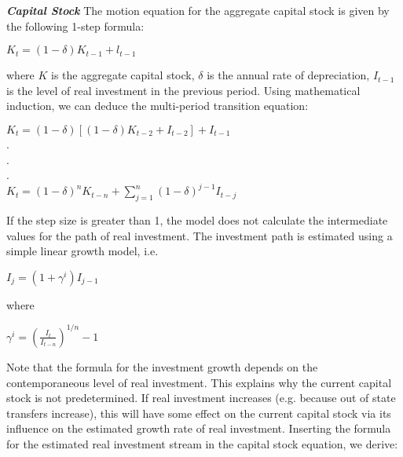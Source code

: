 \documentclass{article}
\begin{document}
\textbf{\textit{Capital Stock}}
The motion equation for the aggregate capital stock is given by the following 1-step formula:

\begin{center}

$K_t = (1-\delta)K_{t-1}+l_{t-1}$

\end{center}

where $K$ is the aggregate capital stock, $\delta$ is the annual rate of depreciation, $I_{t-1}$ is the level of real investment in the previous period. Using mathematical induction, we can deduce the multi-period transition equation:

\begin{center}

$K_t = (1-\delta)[(1-\delta)K_{t-2}+I_{t-2}]+I_{t-1}$\\
.\\[-0.5em] %
.\\[-0.5em]
.\\
$K_t = (1-\delta)^nK_{t-n} + \displaystyle \sum^n_{j=1}(1-\delta)^{j-1}I_{t-j}$

\end{center}

If the step size is greater than 1, the model does not calculate the intermediate values for the path of real investment. The investment path is estimated using a simple linear growth model, i.e.

\begin{center}

$I_j = (1+\gamma^i)I_{j-1}$

\end{center}

where

\begin{center}

$\gamma^i = \left(\frac{I_t}{I_{t-n}}\right)^{1/n}-1$

\end{center}

Note that the formula for the investment growth depends on the contemporaneous level of real investment. This explains why the current capital stock is not predetermined. If real investment increases (e.g. because out of state transfers increase), this will have some effect on the current capital stock via its influence on the estimated growth rate of real investment. Inserting the formula for the estimated real investment stream in the capital stock equation, we derive:
\end{document}
